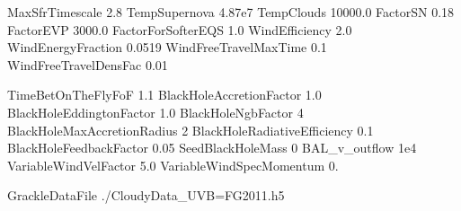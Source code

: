 MaxSfrTimescale     2.8         %
TempSupernova       4.87e7       %
TempClouds          10000.0      %
FactorSN            0.18         %
FactorEVP           3000.0      %
FactorForSofterEQS  1.0         %
WindEfficiency          2.0     %
WindEnergyFraction      0.0519  %
WindFreeTravelMaxTime   0.1     %
WindFreeTravelDensFac   0.01     %

TimeBetOnTheFlyFoF           1.1            %
BlackHoleAccretionFactor     1.0            %
BlackHoleEddingtonFactor     1.0           %
BlackHoleNgbFactor           4              %
BlackHoleMaxAccretionRadius  2              %
BlackHoleRadiativeEfficiency 0.1        %
BlackHoleFeedbackFactor      0.05           %
SeedBlackHoleMass            0
BAL_v_outflow                1e4        %
VariableWindVelFactor        5.0        %
VariableWindSpecMomentum     0.

GrackleDataFile                       ./CloudyData_UVB=FG2011.h5
